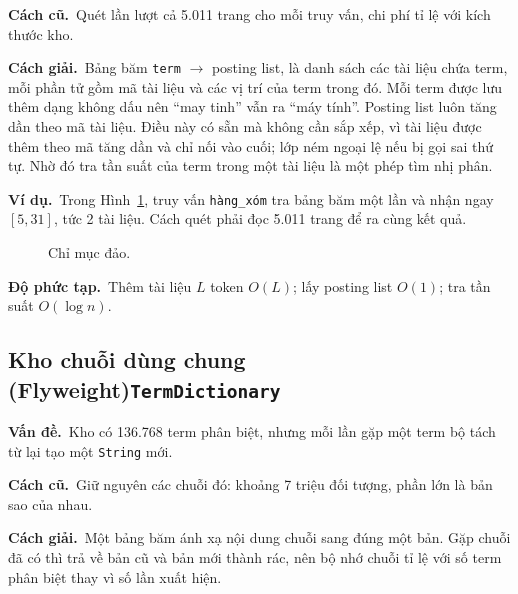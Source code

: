 \documentclass[9pt,twocolumn,a4paper]{extarticle}
\newcommand{\code}[1]{\texttt{#1}}
\newcommand{\dsa}[2]{\subsection[#1]{#1\hfill{\normalfont\footnotesize\code{#2}}}}
\newcommand{\vande}{\textcolor{linkblue}{\textbf{Vấn đề.}}~}
\newcommand{\cachgiai}{\textcolor{linkblue}{\textbf{Cách giải.}}~}
\newcommand{\dpt}{\textcolor{linkblue}{\textbf{Độ phức tạp.}}~}
\newcommand{\cu}{\textcolor{linkblue}{\textbf{Cách cũ.}}~}
\newcommand{\vidu}{\textcolor{linkblue}{\textbf{Ví dụ.}}~}
\begin{document}
\cu Quét lần lượt cả 5.011 trang cho mỗi truy vấn, chi phí tỉ lệ với kích thước kho.

\cachgiai Bảng băm \code{term} $\to$ posting list, là danh sách các tài liệu chứa term, mỗi phần tử gồm mã tài liệu và các vị trí của term trong đó. Mỗi term được lưu thêm dạng không dấu nên ``may tinh'' vẫn ra ``máy tính''. Posting list luôn tăng dần theo mã tài liệu. Điều này có sẵn mà không cần sắp xếp, vì tài liệu được thêm theo mã tăng dần và chỉ nối vào cuối; lớp ném ngoại lệ nếu bị gọi sai thứ tự. Nhờ đó tra tần suất của term trong một tài liệu là một phép tìm nhị phân.

\vidu Trong Hình~\ref{fig:inverted}, truy vấn \code{hàng\_xóm} tra bảng băm một lần và nhận ngay $[5,31]$, tức 2 tài liệu. Cách quét phải đọc 5.011 trang để ra cùng kết quả.

\begin{figure}[H]
\centering
{}
\caption{Chỉ mục đảo.}
\label{fig:inverted}
\end{figure}

\dpt Thêm tài liệu $L$ token $O(L)$; lấy posting list $O(1)$; tra tần suất $O(\log n)$.

\dsa{Kho chuỗi dùng chung (Flyweight)}{TermDictionary}
\vande Kho có 136.768 term phân biệt, nhưng mỗi lần gặp một term bộ tách từ lại tạo một \code{String} mới.

\cu Giữ nguyên các chuỗi đó: khoảng 7 triệu đối tượng, phần lớn là bản sao của nhau.

\cachgiai Một bảng băm ánh xạ nội dung chuỗi sang đúng một bản. Gặp chuỗi đã có thì trả về bản cũ và bản mới thành rác, nên bộ nhớ chuỗi tỉ lệ với số term phân biệt thay vì số lần xuất hiện.
\end{document}
